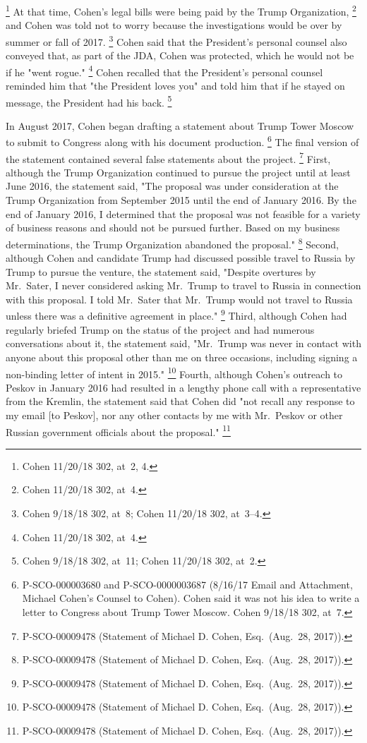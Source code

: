\footnote{Cohen 11/20/18 302, at~2, 4.}
At that time, Cohen's legal bills were being paid by the Trump Organization,%
\footnote{Cohen 11/20/18 302, at~4.}
and Cohen was told not to worry because the investigations would be over by summer or fall of 2017.%
\footnote{Cohen 9/18/18 302, at~8;
Cohen 11/20/18 302, at~3--4.}
Cohen said that the President's personal counsel also conveyed that, as part of the JDA, Cohen was protected, which he would not be if he "went rogue."%
\footnote{Cohen 11/20/18 302, at~4.}
Cohen recalled that the President's personal counsel reminded him that "the President loves you" and told him that if he stayed on message, the President had his back.%
\footnote{Cohen 9/18/18 302, at~11;
Cohen 11/20/18 302, at~2.}

In August 2017, Cohen began drafting a statement about Trump Tower Moscow to submit to Congress along with his document production.%
\footnote{P-SCO-000003680 and P-SCO-0000003687 (8/16/17 Email and Attachment, Michael Cohen's Counsel to Cohen).
Cohen said it was not his idea to write a letter to Congress about Trump Tower Moscow.
Cohen 9/18/18 302, at~7.}
The final version of the statement contained several false statements about the project.%
\footnote{P-SCO-00009478 (Statement of Michael D. Cohen, Esq.\ (Aug.~28, 2017)).}
First, although the Trump Organization continued to pursue the project until at least June 2016, the statement said, "The proposal was under consideration at the Trump Organization from September 2015 until the end of January 2016.
By the end of January 2016, I determined that the proposal was not feasible for a variety of business reasons and should not be pursued further.
Based on my business determinations, the Trump Organization abandoned the proposal."%
\footnote{P-SCO-00009478 (Statement of Michael D. Cohen, Esq.\ (Aug.~28, 2017)).}
Second, although Cohen and candidate Trump had discussed possible travel to Russia by Trump to pursue the venture, the statement said, "Despite overtures by Mr.~Sater, I never considered asking Mr.~Trump to travel to Russia in connection with this proposal.
I told Mr.~Sater that Mr.~Trump would not travel to Russia unless there was a definitive agreement in place."%
\footnote{P-SCO-00009478 (Statement of Michael D. Cohen, Esq.\ (Aug.~28, 2017)).}
Third, although Cohen had regularly briefed Trump on the status of the project and had numerous conversations about it, the statement said, "Mr.~Trump was never in contact with anyone about this proposal other than me on three occasions, including signing a non-binding letter of intent in 2015."%
\footnote{P-SCO-00009478 (Statement of Michael D. Cohen, Esq.\ (Aug.~28, 2017)).}
Fourth, although Cohen's outreach to Peskov in January 2016 had resulted in a lengthy phone call with a representative from the Kremlin, the statement said that Cohen did "not recall any response to my email [to Peskov], nor any other contacts by me with Mr.~Peskov or other Russian government officials about the proposal."%
\footnote{P-SCO-00009478 (Statement of Michael D. Cohen, Esq.\ (Aug.~28, 2017)).}

